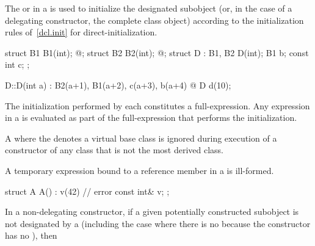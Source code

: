 \pnum
{}%
%
The
or 
in a
is used to initialize the
designated subobject (or, in the case of a delegating constructor, the complete class object)
according to the initialization rules of~\ref{dcl.init} for direct-initialization.
\begin{example}
\begin{codeblock}
struct B1 { B1(int); @\commentellip@ };
struct B2 { B2(int); @\commentellip@ };
struct D : B1, B2 {
  D(int);
  B1 b;
  const int c;
};

D::D(int a) : B2(a+1), B1(a+2), c(a+3), b(a+4) { @\commentellip@ }
D d(10);
\end{codeblock}
\end{example}
\begin{note}
\setlength{\emergencystretch}{1em}
The initialization
performed by each 
constitutes a full-expres\-sion.
Any expression in
a
is evaluated as part of the full-expression that performs the initialization.
\end{note}
A  where the  denotes
a virtual base class is ignored during execution of a constructor of any class that is
not the most derived class.

\pnum
A temporary expression bound to a reference member in a 
is ill-formed.
\begin{example}
\begin{codeblock}
struct A {
  A() : v(42) { }   // error
  const int& v;
};
\end{codeblock}
\end{example}

\pnum
In a non-delegating constructor, if
a given potentially constructed subobject is not designated by a
(including the case where there is no
because the constructor has no
),
then


